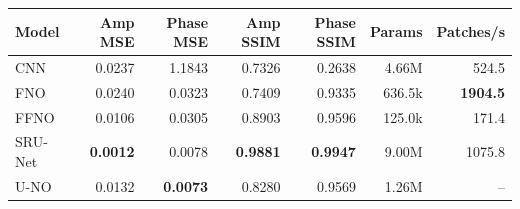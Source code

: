 \begin{tabular}{@{}lrrrrrr@{}}
\toprule
Model & Amp MSE & Phase MSE & Amp SSIM & Phase SSIM & Params & Patches/s \\
\midrule
CNN & 0.0237 & 1.1843 & 0.7326 & 0.2638 & 4.66M & 524.5 \\
FNO & 0.0240 & 0.0323 & 0.7409 & 0.9335 & 636.5k & \textbf{1904.5} \\
FFNO & 0.0106 & 0.0305 & 0.8903 & 0.9596 & 125.0k & 171.4 \\
SRU-Net & \textbf{0.0012} & 0.0078 & \textbf{0.9881} & \textbf{0.9947} & 9.00M & 1075.8 \\
U-NO & 0.0132 & \textbf{0.0073} & 0.8280 & 0.9569 & 1.26M & -- \\
\bottomrule
\end{tabular}
